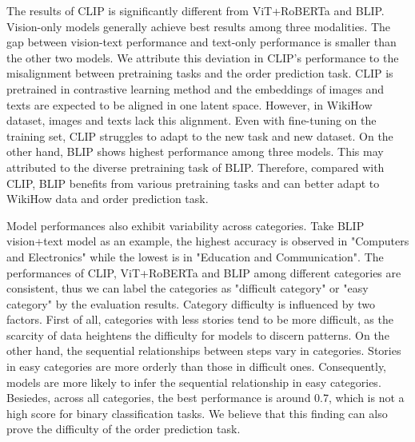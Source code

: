 \documentclass[11pt]{article}
\begin{document}
The results of CLIP is significantly different from ViT+RoBERTa and BLIP. Vision-only models generally achieve best results among three modalities. The gap between vision-text performance and text-only performance is smaller than the other two models. We attribute this deviation in CLIP's performance to the misalignment between pretraining tasks and the order prediction task. CLIP is pretrained in contrastive learning method and the embeddings of images and texts are expected to be aligned in one latent space. However, in WikiHow dataset, images and texts lack this alignment. Even with fine-tuning on the training set, CLIP struggles to adapt to the new task and new dataset. On the other hand, BLIP shows highest performance among three models. This may attributed to the diverse pretraining task of BLIP. Therefore, compared with CLIP, BLIP benefits from various pretraining tasks and can better adapt to WikiHow data and order prediction task.

Model performances also exhibit variability across categories. Take BLIP vision+text model as an example, the highest accuracy is observed in "Computers and Electronics" while the lowest is in "Education and Communication". The performances of CLIP, ViT+RoBERTa and BLIP among different categories are consistent, thus we can label the categories as "difficult category" or "easy category" by the evaluation results. Category difficulty is influenced by two factors. First of all, categories with less stories tend to be more difficult, as the scarcity of data heightens the difficulty for models to discern patterns. On the other hand, the sequential relationships between steps vary in categories. Stories in easy categories are more orderly than those in difficult ones. Consequently, models are more likely to infer the sequential relationship in easy categories. Besiedes, across all categories, the best performance is around 0.7, which is not a high score for binary classification tasks. We believe that this finding can also prove the difficulty of the order prediction task.


\end{document}
